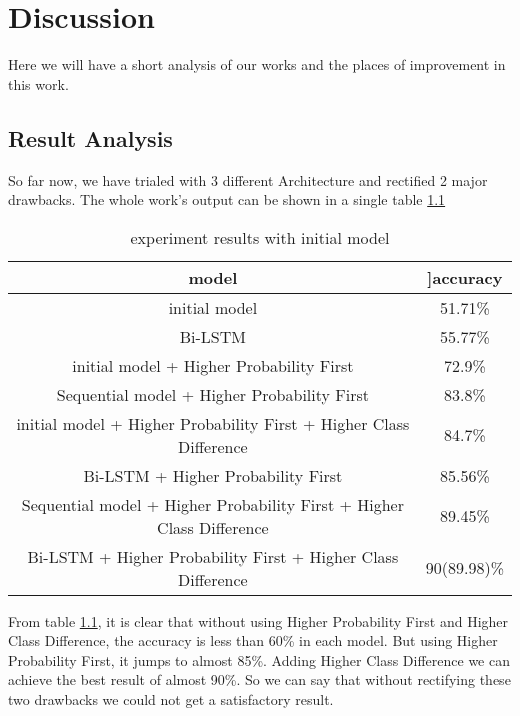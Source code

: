 \documentclass{standalone}
\begin{document}
\chapter{Discussion}
\label{chap:Discussion}
Here we will have a short analysis of our works and the places of improvement in this work.
\section{Result Analysis}
So far now, we have trialed with 3 different Architecture and rectified 2 major drawbacks. The whole work’s output can be shown in a single table \ref{finaltable}
\begin{table}[h!]
    \centering
        \begin{tabular}{|c|c|}
            \hline
            \textbf{model} & ]\textbf{accuracy} \\ [1ex]
            \hline
            initial model & 51.71\% \\
            \hline
             Bi-LSTM & 55.77\% \\
              \hline
                initial model + Higher Probability First & 72.9\%\\
            \hline
             Sequential model + Higher Probability First & 83.8\%\\
            \hline
           
            initial model + Higher Probability First + Higher Class
            Difference & 84.7\%  \\ 
            \hline
            Bi-LSTM + Higher Probability First & 85.56\%\\
            \hline
            Sequential model + Higher Probability First + Higher Class
            Difference & 89.45\%  \\ 
            \hline
            Bi-LSTM + Higher Probability First + Higher Class
            Difference & 90(89.98)\%  \\ 
            \hline
        \end{tabular}
        \caption{experiment results with initial model}
        \label{finaltable}
\end{table}
From table \ref{finaltable}, it is clear that without using Higher Probability First and Higher Class Difference, the accuracy is less than 60\% in each model. But using Higher Probability First, it jumps to almost 85\%. Adding Higher Class Difference we can achieve the best result of almost 90\%. So we can say that without rectifying these two drawbacks we could not get a satisfactory result.
\end{document}
